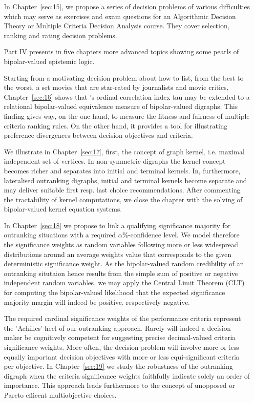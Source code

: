 In Chapter~\vref{sec:15}, we propose a series of decision problems of various difficulties which may serve as exercises and exam questions for an Algorithmic Decision Theory or Multiple Criteria Decision Analysis course. They cover selection, ranking and rating decision problems.

Part IV presents in five chapters more advanced topics showing some pearls of bipolar-valued epistemic logic.

Starting from a motivating decision problem about how to list, from the best to the worst, a set movies that are star-rated by journalists and movie critics, Chapter~\vref{sec:16} shows that \Kendall’s ordinal correlation index tau may be extended to a relational bipolar-valued equivalence measure of bipolar-valued digraphs. This finding gives way, on the one hand, to measure the fitness and fairness of multiple criteria ranking rules. On the other hand, it provides a tool for illustrating preference divergences between decision objectives and criteria.

We illustrate in Chapter~\vref{sec:17}, first, the concept of graph kernel, i.e. maximal independent set of vertices. In non-symmetric digraphs the kernel concept becomes richer and separates into initial and terminal kernels. In, furthermore, lateralised outranking digraphs, initial and terminal kernels become separate and may deliver suitable first resp. last choice recommendations. After commenting the tractability of kernel computations, we close the chapter with the solving of bipolar-valued kernel equation systems.

In Chapter~\vref{sec:18} we propose to link a qualifying significance majority for outranking situations with a required $\alpha\%$-confidence level. We model therefore the significance weights as random variables following more or less widespread distributions around an average weights value that corresponds to the given deterministic significance weight. As the bipolar-valued random credibility of an outranking situtaion hence results from the simple sum of positive or negative independent random variables, we may apply the Central Limit Theorem (CLT) for computing the bipolar-valued likelihood that the expected significance majority margin will indeed be positive, respectively negative.

The required cardinal significance weights of the performance criteria represent the ’Achilles’ heel of our outranking approach. Rarely will indeed a decision maker be cognitively competent for suggesting precise decimal-valued criteria significance weights. More often, the decision problem will involve more or less equally important decision objectives with more or less equi-significant criteria per objective. In Chapter~\vref{sec:19} we study the robustness of the outranking digraph when the criteria significance weights faithfully indicate solely an order of importance. This approach leads furthermore to the concept of unopposed or Pareto efficent multiobjective choices.

